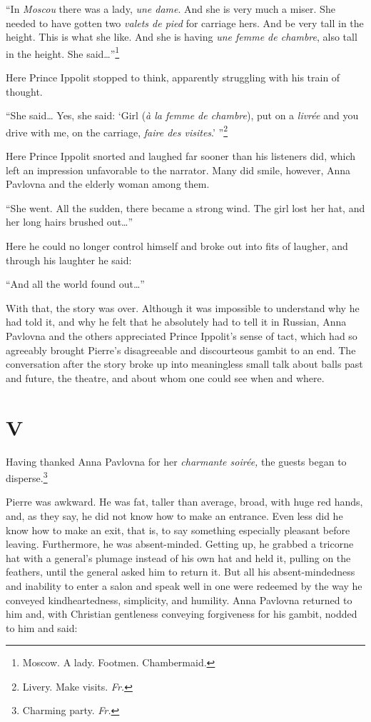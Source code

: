 ``In \textit{Moscou} there was a lady, \textit{une dame}. And she is very much a miser. She needed to have gotten two \textit{valets de pied} for carriage hers. And be very tall in the height. This is what she like. And she is having \textit{une femme de chambre}, also tall in the height. She said\ldots{}''\footnote{Moscow. A lady. Footmen. Chambermaid.} %

Here Prince Ippolit stopped to think, apparently struggling with his train of thought.

``She said\ldots{} Yes, she said: `Girl (\textit{\`a la femme de chambre}), put on a \textit{livr\'ee} and you drive with me, on the carriage, \textit{faire des visites}.' ''\footnote{Livery. Make visits. \textit{Fr.}} %

Here Prince Ippolit snorted and laughed far sooner than his listeners did, which left an impression unfavorable to the narrator. Many did smile, however, Anna Pavlovna and the elderly woman among them.

``She went. All the sudden, there became a strong wind. The girl lost her hat, and her long hairs brushed out\ldots{}'' %

Here he could no longer control himself and broke out into fits of laugher, and through his laughter he said:

``And all the world found out\ldots{}'' %

With that, the story was over. Although it was impossible to understand why he had told it, and why he felt that he absolutely had to tell it in Russian, Anna Pavlovna and the others appreciated Prince Ippolit's sense of tact, which had so agreeably brought Pierre's disagreeable and discourteous gambit to an end. The conversation after the story broke up into meaningless small talk about balls past and future, the theatre, and about whom one could see when and where.

\section*{V} %

Having thanked Anna Pavlovna for her \textit{charmante soir\'ee,} the guests began to disperse.\footnote{Charming party. \textit{Fr.}}

Pierre was awkward. He was fat, taller than average, broad, with huge red hands, and, as they say, he did not know how to make an entrance. Even less did he know how to make an exit, that is, to say something especially pleasant before leaving. Furthermore, he was absent-minded. Getting up, he grabbed a tricorne hat with a general's plumage instead of his own hat and held it, pulling on the feathers, until the general asked him to return it. But all his absent-mindedness and inability to enter a salon and speak well in one were redeemed by the way he conveyed kindheartedness, simplicity, and humility. Anna Pavlovna returned to him and, with Christian gentleness conveying forgiveness for his gambit, nodded to him and said:


